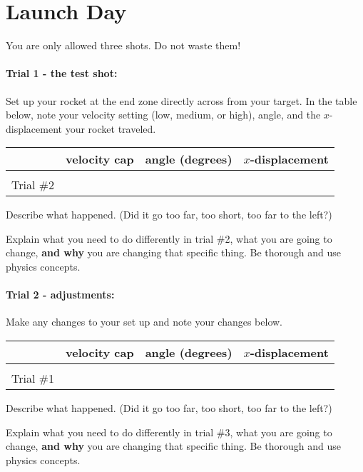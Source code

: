 \documentclass[10pt]{exam}
\begin{document}
\section*{Launch Day}

You are only allowed three shots.  Do not waste them!

\paragraph{Trial 1 - the test shot:}  Set up your rocket at the end zone directly across from your target.  In the table below, note your velocity setting (low, medium, or high), angle, and the $x$-displacement your rocket traveled.

\noindent
\begin{tabular}{|*4{l|}}
  \hline
  & velocity cap & angle (degrees) & $x$-displacement\\\hline
  &&& \\
  Trial \#2 &&& \\
  \hline
\end{tabular}

\noindent
Describe what happened. (Did it go too far, too short, too far to the left?)
\vspace{5em}

\noindent
Explain what you need to do differently in trial \#2, what you are going to change, {\bf and why} you are changing that specific thing.  Be thorough and use physics concepts.
\vspace{5em}


\paragraph{Trial 2 - adjustments:}  Make any changes to your set up and note your changes below.

\noindent
\begin{tabular}{|*4{l|}}
  \hline
  & velocity cap & angle (degrees) & $x$-displacement\\\hline
  &&& \\
  Trial \#1 &&& \\
  \hline
\end{tabular}

\noindent
Describe what happened. (Did it go too far, too short, too far to the left?)
\vspace{5em}

\noindent
Explain what you need to do differently in trial \#3, what you are going to change, {\bf and why} you are changing that specific thing.  Be thorough and use physics concepts.
\vspace{5em}
\end{document}
